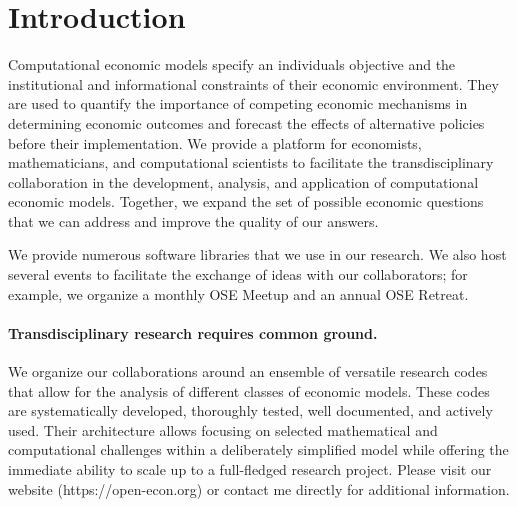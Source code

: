 \section{Introduction}


Computational economic models specify an individuals objective and the institutional and informational constraints of their economic environment. They are used to quantify the importance of competing economic mechanisms in determining economic outcomes and forecast the effects of alternative policies before their implementation. We provide a platform for economists, mathematicians, and computational scientists to facilitate the transdisciplinary collaboration in the development, analysis, and application of computational economic models. Together, we expand the set of possible economic questions that we can address and improve the quality of our answers.

We provide numerous software libraries that we use in our research. We also host several events to facilitate the exchange of ideas with our collaborators; for example, we organize a monthly OSE Meetup and an annual OSE Retreat.

\paragraph{Transdisciplinary research requires common ground.} We organize our collaborations around an ensemble of versatile research codes that allow for the analysis of different classes of economic models. These codes are systematically developed, thoroughly tested, well documented, and actively used. Their architecture allows focusing on selected mathematical and computational challenges within a deliberately simplified model while offering the immediate ability to scale up to a full-fledged research project. Please visit our website (https://open-econ.org) or contact me directly for additional information.

